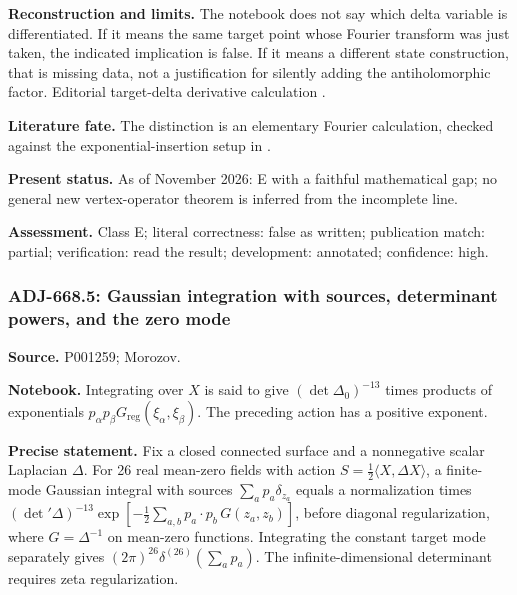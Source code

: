 \noindent\textbf{Reconstruction and limits.} The notebook does not say which delta variable is differentiated. If it means the same target point whose Fourier transform was just taken, the indicated implication is false. If it means a different state construction, that is missing data, not a justification for silently adding the antiholomorphic factor. Editorial target-delta derivative calculation \oursComputed.\par

\noindent\textbf{Literature fate.} The distinction is an elementary Fourier calculation, checked against the exponential-insertion setup in \citet[eqs.~(26)--(31)]{polyakov1981quantum}.\par

\noindent\textbf{Present status.} As of November 2026: E with a faithful mathematical gap; no general new vertex-operator theorem is inferred from the incomplete line.\par

\noindent\textbf{Assessment.} Class E; literal correctness: false as written; publication match: partial; verification: read the result; development: annotated; confidence: high.\par

\subsubsection{ADJ-668.5: Gaussian integration with sources, determinant powers, and the zero mode}
\noindent\textbf{Source.} P001259; Morozov.\par
\noindent\textbf{Notebook.} Integrating over \(X\) is said to give \((\det\Delta_0)^{-13}\) times products of exponentials \(p_\alpha p_\beta G_{\mathrm{reg}}(\xi_\alpha,\xi_\beta)\). The preceding action has a positive exponent.\par

\noindent\textbf{Precise statement.} Fix a closed connected surface and a nonnegative scalar Laplacian \(\Delta\). For 26 real mean-zero fields with action \(S=\frac12\langle X,\Delta X\rangle\), a finite-mode Gaussian integral with sources \(\sum_a p_a\delta_{z_a}\) equals a normalization times \((\det{}'\Delta)^{-13}\exp[-\frac12\sum_{a,b}p_a\cdot p_b\,G(z_a,z_b)]\), before diagonal regularization, where \(G=\Delta^{-1}\) on mean-zero functions. Integrating the constant target mode separately gives \((2\pi)^{26}\delta^{(26)}(\sum_a p_a)\). The infinite-dimensional determinant requires zeta regularization.\par

